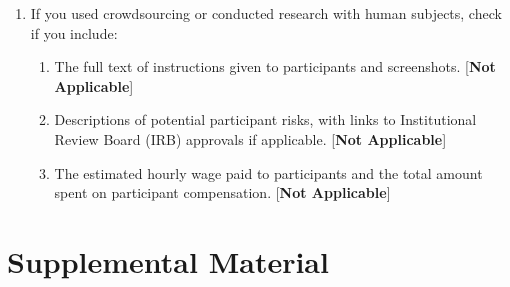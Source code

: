 \documentclass[twoside]{article}
\begin{document}
{\begin{enumerate}
 \item If you used crowdsourcing or conducted research with human subjects, check if you include:
 \begin{enumerate}
   \item The full text of instructions given to participants and screenshots. [\textbf{Not Applicable}]
   \item Descriptions of potential participant risks, with links to Institutional Review Board (IRB) approvals if applicable. [\textbf{Not Applicable}]
   \item The estimated hourly wage paid to participants and the total amount spent on participant compensation. [\textbf{Not Applicable}]
 \end{enumerate}

 \end{enumerate}
}

\newpage
\onecolumn
\section*{Supplemental Material}
\appendix

\end{document}
